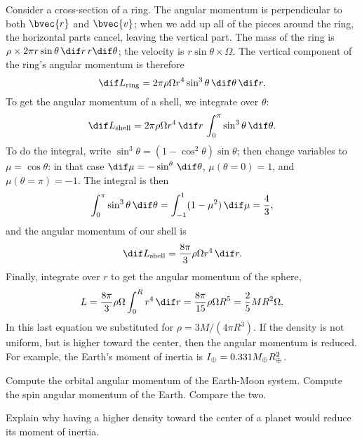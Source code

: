 Consider a cross-section of a ring.  The angular momentum is perpendicular to both $\bvec{r}$ and $\bvec{v}$; when we add up all of the pieces around the ring, the horizontal parts cancel, leaving the vertical part.  The mass of the ring is $\rho\times 2\pi r\sin\theta\,\dif r\,r\dif\theta$; the velocity is $r\sin\theta \times \Omega$.  The vertical component of the ring's angular momentum is therefore
\[
	\dif L_{\mathrm{ring}} = 2\pi \rho\Omega r^{4}\sin^{3}\theta\, \dif \theta \,\dif r.
\]
To get the angular momentum of a shell, we integrate over $\theta$:
\[
	\dif L_{\mathrm{shell}} = 2\pi\rho\Omega r^{4}\,\dif r\,\int_{0}^{\pi}\sin^{3}\theta\,\dif\theta.
\]
To do the integral, write $\sin^{3}\theta = (1-\cos^{2}\theta)\sin\theta$; then change variables to $\mu = \cos \theta$: in that case $\dif\mu = -\sin^\theta\,\dif\theta$, $\mu(\theta = 0) = 1$, and $\mu(\theta=\pi)=-1$.  The integral is then
\[
	\int_{0}^{\pi}\sin^{3}\theta\,\dif\theta = \int_{-1}^{1}(1-\mu^{2})\,\dif\mu 
		= \frac{4}{3},
\]
and the angular momentum of our shell is
\[
	\dif L_{\mathrm{shell}} = \frac{8\pi}{3}\rho\Omega r^{4}\,\dif r.
\]
Finally, integrate over $r$ to get the angular momentum of the sphere,
\begin{equation}\label{e.ang-momentum-sphere}
	L = \frac{8\pi}{3}\rho\Omega \int_{0}^{R}r^{4}\,\dif r = \frac{8\pi}{15}\rho\Omega R^{5} = \frac{2}{5} MR^{2}\Omega.
\end{equation}
In this last equation we substituted for $\rho = 3M/(4\pi R^{3})$. If the density is not uniform, but is higher toward the center, then the angular momentum is reduced. For example, the Earth's moment of inertia is\cite{Lissauer2013Fundamental-Pla} $I_{\oplus} = 0.331 M_{\oplus}R_{\oplus}^{2}$.

\begin{exercisebox}
Compute the orbital angular momentum of the Earth-Moon system.  Compute the spin angular momentum of the Earth. Compare the two.
\end{exercisebox}

\begin{exercisebox}
Explain why having a higher density toward the center of a planet would reduce its moment of inertia.
\end{exercisebox}



